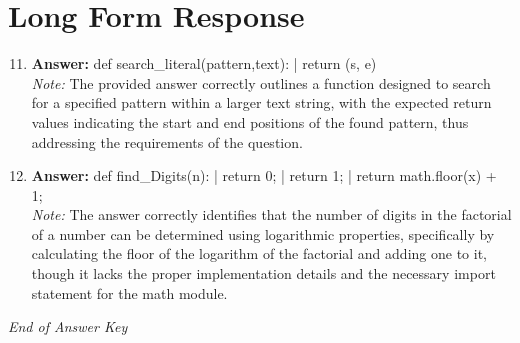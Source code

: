 \documentclass[12pt]{article}
\begin{document}
\section*{Long Form Response}
\begin{enumerate}[label=\arabic*.]
\setcounter{enumi}{10}
\item \textbf{Answer:} def search\_literal(pattern,text): | return (s, e)
\\ \textit{Note:} The provided answer correctly outlines a function designed to search for a specified pattern within a larger text string, with the expected return values indicating the start and end positions of the found pattern, thus addressing the requirements of the question.
\item \textbf{Answer:} def find\_Digits(n): | return 0; | return 1; | return math.floor(x) + 1;
\\ \textit{Note:} The answer correctly identifies that the number of digits in the factorial of a number can be determined using logarithmic properties, specifically by calculating the floor of the logarithm of the factorial and adding one to it, though it lacks the proper implementation details and the necessary import statement for the math module.
\end{enumerate}

\vfill
\noindent\textit{End of Answer Key}
\end{document}
